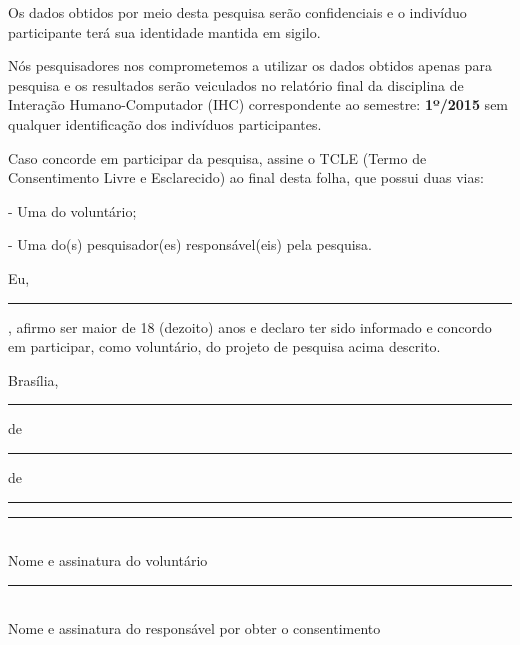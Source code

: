 Os dados obtidos por meio desta pesquisa serão confidenciais e o indivíduo participante terá sua identidade mantida em sigilo.

Nós pesquisadores nos comprometemos a utilizar os dados obtidos apenas para pesquisa e os resultados serão veiculados no relatório final da disciplina de Interação Humano-Computador (IHC) correspondente ao semestre: \textbf{1º/2015} sem qualquer
identificação dos indivíduos participantes.

Caso concorde em participar da pesquisa, assine o TCLE (Termo de Consentimento Livre e Esclarecido) ao final desta folha, que possui duas vias:

- Uma do voluntário;

- Uma do(s) pesquisador(es) responsável(eis) pela pesquisa.

\vspace{0.5cm}

Eu,\rule{8cm}{0.5pt}, afirmo ser maior de 18 (dezoito) anos e declaro ter sido informado e concordo em participar, como voluntário, do projeto de pesquisa acima descrito.


\raggedleft
Brasília,\rule{1cm}{0.5pt}de\rule{1cm}{0.5pt}de\rule{1cm}{0.5pt}

\vspace{1cm}

\centering
\rule{10cm}{0.5pt}\\
Nome e assinatura do voluntário\\

\vspace{1cm}

\centering
\rule{10cm}{0.5pt}\\
Nome e assinatura do responsável por obter o consentimento
